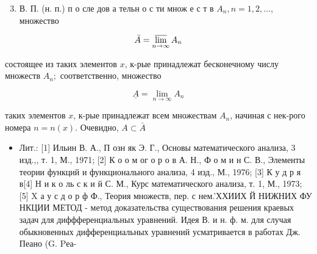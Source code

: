 \documentclass[10pt]{article}
\begin{document}
\begin{enumerate}

  \setcounter{enumi}{2}

  \item В. П. (н. п.) п о сле дов а тельн о с ти множ е с т в $A_{n}, n=1,2, \ldots$, множество

\end{enumerate}



\[

\bar{A}=\varlimsup_{n \rightarrow \infty} A_{n}

\]



состоящее из таких элементов $x$, к-рые принадлежат бесконечному числу множеств $A_{n} ;$ соответственно, множество



\[

\underline{A}=\underset{n \rightarrow \infty}{\lim } A_{n}

\]



таких элементов $x$, к-рые принадлежат всем множествам $A_{n}$, начиная с нек-рого номера $n=n(x)$. Очевидно, $A \subset \bar{A}$



\begin{itemize}

  \item Лит.: [1] Ильин В. А., П озн як Э. Г., Основы математического анализа, 3 изд.,, т. 1, М., 1971; [2] К о о м ог о р о в А. Н., Ф о м и н С. В., Элементы теории функций и функционального анализа, 4 изд., М., 1976; [3] К у д р я в[4] Н и к о ль с к и й С. М., Курс математического анализа, т. 1, М., 1973; [5] X а у с д о р ф Ф., Теория множеств, пер. с нем.'ХХИИХ Й НИЖНИХ ФУ НКЦИИ МЕТОД - метод доказательства существования решения краевых задач для диффференциальных уравнений. Идея В. и н. ф. м. для случая обыкновенных дифференциальных уравнений усматривается в работах Дж. Пеано (G. Pеа-

\end{itemize}
\end{document}
